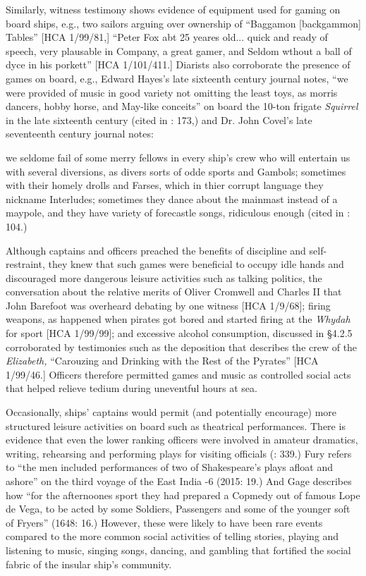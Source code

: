 Similarly, witness testimony shows evidence of equipment used for gaming on board ships, e.g., two sailors arguing over ownership of “Baggamon [backgammon] Tables” [HCA 1/99/81,] “Peter Fox abt 25 yeares old... quick and ready of speech, very plausable in Company, a great gamer, and Seldom wthout a ball of dyce in his porkett” [HCA 1/101/411.] Diarists also corroborate the presence of games on board, e.g., Edward Hayes’s late sixteenth century journal notes, “we were provided of music in good variety not omitting the least toys, as morris dancers, hobby horse, and May-like conceits” on board the 10-ton frigate \textit{Squirrel} in the late sixteenth century (cited in \citealt{Bicheno2012}: 173,) and Dr. John Covel’s late seventeenth century journal notes:

we seldome fail of some merry fellows in every ship’s crew who will entertain us with several diversions, as divers sorts of odde sports and Gambols; sometimes with their homely drolls and Farses, which in thier corrupt language they nickname Interludes; sometimes they dance about the mainmast instead of a maypole, and they have variety of forecastle songs, ridiculous enough (cited in \citealt{Palmer1986}: 104.)

Although captains and officers preached the benefits of discipline and self-restraint, they knew that such games were beneficial to occupy idle hands and discouraged more dangerous leisure activities such as talking politics, the conversation about the relative merits of Oliver Cromwell and Charles II that John Barefoot was overheard debating by one witness [HCA 1/9/68]; firing weapons, as happened when pirates got bored and started firing at the \textit{Whydah} for sport [HCA 1/99/99]; and excessive alcohol consumption, discussed in §4.2.5 corroborated by testimonies such as the deposition that describes the crew of the \textit{Elizabeth,} “Carouzing and Drinking with the Rest of the Pyrates” [HCA 1/99/46.] Officers therefore permitted games and music as controlled social acts that helped relieve tedium during uneventful hours at sea. 

Occasionally, ships’ captains would permit (and potentially encourage) more structured leisure activities on board such as theatrical performances. There is evidence that even the lower ranking officers were involved in amateur dramatics, writing, rehearsing and performing plays for visiting officials (\citealt{AdkinsAdkins2008}: 339.) Fury refers to “the men included performances of two of Shakespeare’s plays afloat and ashore” on the third voyage of the East India \citealt{Company1604}-6 (2015: 19.) And Gage describes how “for the afternoones sport they had prepared a Copmedy out of famous Lope de Vega, to be acted by some Soldiers, Passengers and some of the younger soft of Fryers” (1648: 16.) However, these were likely to have been rare events compared to the more common social activities of telling stories, playing and listening to music, singing songs, dancing, and gambling that fortified the social fabric of the insular ship’s community. 

